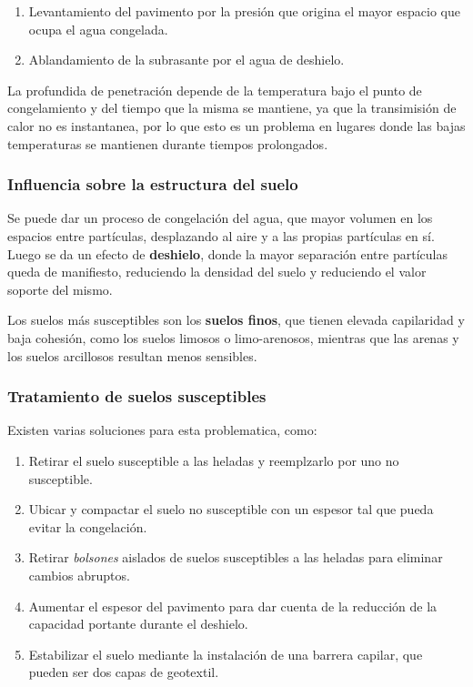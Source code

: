 \documentclass[../main.tex]{subfiles}
\begin{document}
\begin{enumerate}
  \item Levantamiento del pavimento por la presión que origina el mayor espacio
    que ocupa el agua congelada.
  \item Ablandamiento de la subrasante por el agua de deshielo.
\end{enumerate}

La profundida de penetración depende de la temperatura bajo el punto de congelamiento
y del tiempo que la misma se mantiene, ya que la transimisión de calor no es 
instantanea, por lo que esto es un problema en lugares donde las bajas temperaturas
se mantienen durante tiempos prolongados.

\subsubsection{Influencia sobre la estructura del suelo}

Se puede dar un proceso de congelación del agua, que mayor volumen en los
espacios entre partículas, desplazando al aire y a las propias partículas en sí.
Luego se da un efecto de \textbf{deshielo}, donde la mayor separación entre partículas
queda de manifiesto, reduciendo la densidad del suelo y reduciendo el valor
soporte del mismo.

Los suelos más susceptibles son los \textbf{suelos finos}, que tienen elevada
capilaridad y baja cohesión, como los suelos limosos o limo-arenosos, mientras
que las arenas y los suelos arcillosos resultan menos sensibles.

\subsubsection{Tratamiento de suelos susceptibles}

Existen varias soluciones para esta problematica, como:

\begin{enumerate}
  \item Retirar el suelo susceptible a las heladas y reemplzarlo por uno no
    susceptible.
  \item Ubicar y compactar el suelo no susceptible con un espesor tal que pueda
    evitar la congelación.
  \item Retirar \textit{bolsones} aislados de suelos susceptibles a las heladas
    para eliminar cambios abruptos.
  \item Aumentar el espesor del pavimento para dar cuenta de la reducción de la 
    capacidad portante durante el deshielo.
  \item Estabilizar el suelo mediante la instalación de una barrera capilar, que 
    pueden ser dos capas de geotextil.
\end{enumerate}
\end{document}
